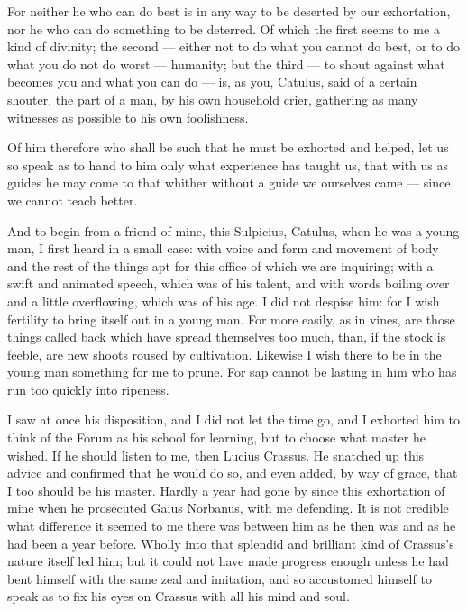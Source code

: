 For neither he who can do best is in any way to be deserted by our exhortation, nor he who can do something to be deterred. Of which the first seems to me a kind of divinity; the second — either not to do what you cannot do best, or to do what you do not do worst — humanity; but the third — to shout against what becomes you and what you can do — is, as you, Catulus, said of a certain shouter, the part of a man, by his own household crier, gathering as many witnesses as possible to his own foolishness.

 Of him therefore who shall be such that he must be exhorted and helped, let us so speak as to hand to him only what experience has taught us, that with us as guides he may come to that whither without a guide we ourselves came — since we cannot teach better.

 And to begin from a friend of mine, this Sulpicius, Catulus, when he was a young man, I first heard in a small case: with voice and form and movement of body and the rest of the things apt for this office of which we are inquiring; with a swift and animated speech, which was of his talent, and with words boiling over and a little overflowing, which was of his age. I did not despise him: for I wish fertility to bring itself out in a young man. For more easily, as in vines, are those things called back which have spread themselves too much, than, if the stock is feeble, are new shoots roused by cultivation. Likewise I wish there to be in the young man something for me to prune. For sap cannot be lasting in him who has run too quickly into ripeness.

 I saw at once his disposition, and I did not let the time go, and I exhorted him to think of the Forum as his school for learning, but to choose what master he wished. If he should listen to me, then Lucius Crassus. He snatched up this advice and confirmed that he would do so, and even added, by way of grace, that I too should be his master. Hardly a year had gone by since this exhortation of mine when he prosecuted Gaius Norbanus, with me defending. It is not credible what difference it seemed to me there was between him as he then was and as he had been a year before. Wholly into that splendid and brilliant kind of Crassus's nature itself led him; but it could not have made progress enough unless he had bent himself with the same zeal and imitation, and so accustomed himself to speak as to fix his eyes on Crassus with all his mind and soul.

